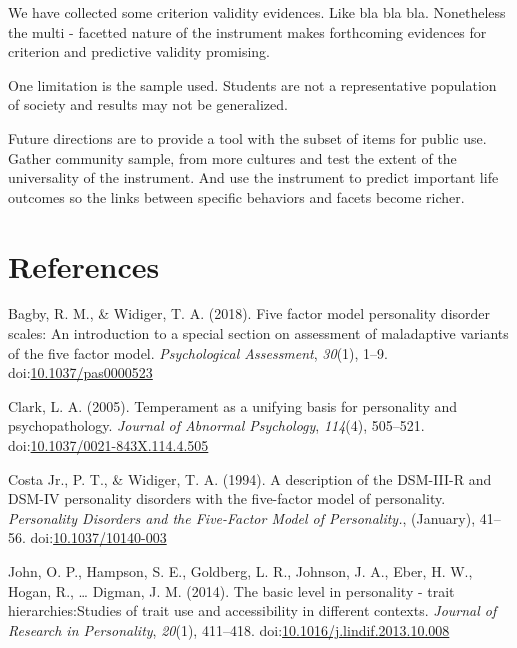 \documentclass[,man,floatsintext]{apa6}
\theoremstyle{definition}
\theoremstyle{definition}
\theoremstyle{definition}
\theoremstyle{remark}
\begin{document}
We have collected some criterion validity evidences. Like bla bla bla.
Nonetheless the multi - facetted nature of the instrument makes
forthcoming evidences for criterion and predictive validity promising.

One limitation is the sample used. Students are not a representative
population of society and results may not be generalized.

Future directions are to provide a tool with the subset of items for
public use. Gather community sample, from more cultures and test the
extent of the universality of the instrument. And use the instrument to
predict important life outcomes so the links between specific behaviors
and facets become richer.

\newpage

\hypertarget{references}{%
\section{References}\label{references}}

\begingroup
\setlength{\parindent}{-0.5in}
\setlength{\leftskip}{0.5in}

\hypertarget{refs}{}
\leavevmode\hypertarget{ref-Bagby2018}{}%
Bagby, R. M., \& Widiger, T. A. (2018). Five factor model personality
disorder scales: An introduction to a special section on assessment of
maladaptive variants of the five factor model. \emph{Psychological
Assessment}, \emph{30}(1), 1--9.
doi:\href{https://doi.org/10.1037/pas0000523}{10.1037/pas0000523}

\leavevmode\hypertarget{ref-Clark2005}{}%
Clark, L. A. (2005). Temperament as a unifying basis for personality and
psychopathology. \emph{Journal of Abnormal Psychology}, \emph{114}(4),
505--521.
doi:\href{https://doi.org/10.1037/0021-843X.114.4.505}{10.1037/0021-843X.114.4.505}

\leavevmode\hypertarget{ref-Widiger1994}{}%
Costa Jr., P. T., \& Widiger, T. A. (1994). A description of the
DSM-III-R and DSM-IV personality disorders with the five-factor model of
personality. \emph{Personality Disorders and the Five-Factor Model of
Personality.}, (January), 41--56.
doi:\href{https://doi.org/10.1037/10140-003}{10.1037/10140-003}

\leavevmode\hypertarget{ref-Ziegler2014}{}%
John, O. P., Hampson, S. E., Goldberg, L. R., Johnson, J. A., Eber, H.
W., Hogan, R., \ldots{} Digman, J. M. (2014). The basic level in
personality - trait hierarchies:Studies of trait use and accessibility
in different contexts. \emph{Journal of Research in Personality},
\emph{20}(1), 411--418.
doi:\href{https://doi.org/10.1016/j.lindif.2013.10.008}{10.1016/j.lindif.2013.10.008}
\end{document}
